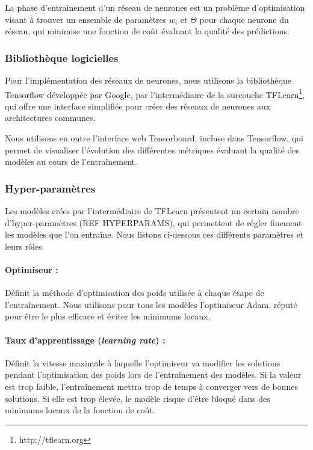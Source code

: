 \par La phase d'entraînement d'un réseau de neurones est un problème d'optimisation visant à trouver un ensemble de paramètres $w_i$ et $\Theta$ pour chaque neurone du réseau, qui minimise une fonction de coût évaluant la qualité des prédictions.

\subsubsection{Bibliothèque logicielles}

\par Pour l'implémentation des réseaux de neurones, nous utilisons la bibliothèque Tensorflow\cite{tf} développée par Google, par l'intermédiaire de la surcouche TFLearn\footnote{http://tflearn.org}, qui offre une interface simplifiée pour créer des réseaux de neurones aux architectures communes.\\

\par Nous utilisons en outre l'interface web Tensorboard, incluse dans Tensorflow, qui permet de visualiser l'évolution des différentes métriques évaluant la qualité des modèles au cours de l'entraînement.

\subsubsection{Hyper-paramètres}

\par Les modèles crées par l'intermédiaire de TFLearn présentent un certain nombre d'hyper-paramètres (REF HYPERPARAMS), qui permettent de régler finement les modèles que l'on entraîne. Nous listons ci-dessous ces différents paramètres et leurs rôles.

\paragraph{Optimiseur : } Définit la méthode d'optimisation des poids utilisée à chaque étape de l'entraînement. Nous utilisons pour tous les modèles l'optimiseur Adam, réputé pour être le plus efficace et éviter les minimums locaux.

\paragraph{Taux d'apprentissage (\emph{learning rate}) : } Définit la vitesse maximale à laquelle l'optimiseur va modifier les solutions pendant l'optimisation des poids lors de l'entraînement des modèles. Si la valeur est trop faible, l'entraînement mettra trop de temps à converger vers de bonnes solutions. Si elle est trop élevée, le modèle risque d'être bloqué dans des minimums locaux de la fonction de coût.


